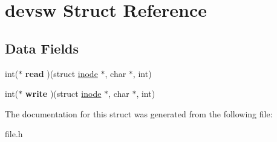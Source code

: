\hypertarget{structdevsw}{}\section{devsw Struct Reference}
\label{structdevsw}
\subsection*{Data Fields}
\begin{DoxyCompactItemize}
\item 
\mbox{\label{structdevsw_a4efbe00d0031a1c9005ef2186947ea37}} 
int($\ast$ {\bfseries read} )(struct \mbox{\hyperlink{structinode}{inode}} $\ast$, char $\ast$, int)
\item 
\mbox{\label{structdevsw_a87fd7af6c9a6fb8663fc206be7a233d4}} 
int($\ast$ {\bfseries write} )(struct \mbox{\hyperlink{structinode}{inode}} $\ast$, char $\ast$, int)
\end{DoxyCompactItemize}


The documentation for this struct was generated from the following file\+:\begin{DoxyCompactItemize}
\item 
file.\+h\end{DoxyCompactItemize}

